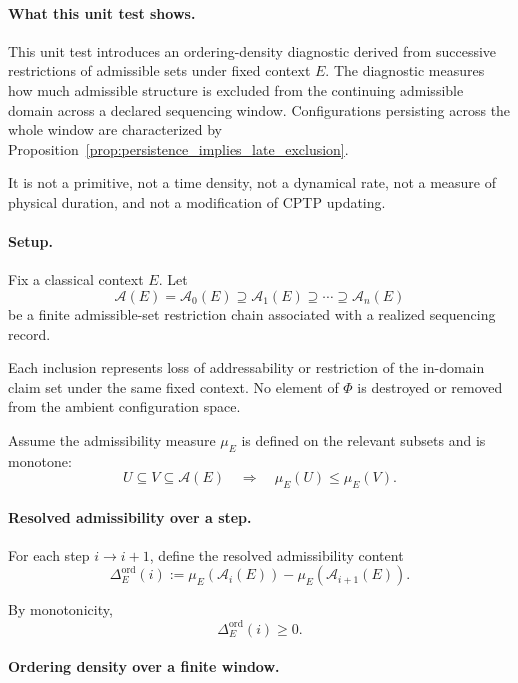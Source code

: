 \documentclass[aps,prx,onecolumn,11pt]{revtex4-2}
\theoremstyle{plain}
\theoremstyle{definition}
\theoremstyle{remark}
\begin{document}
\paragraph{What this unit test shows.}

This unit test introduces an ordering-density diagnostic derived from
successive restrictions of admissible sets under fixed context \(E\).
The diagnostic measures how much admissible structure is excluded from
the continuing admissible domain across a declared sequencing window.
Configurations persisting across the whole window are characterized by
Proposition~\ref{prop:persistence_implies_late_exclusion}.

It is not a primitive, not a time density, not a dynamical rate, not a
measure of physical duration, and not a modification of CPTP updating.

\paragraph{Setup.}

Fix a classical context \(E\). Let
\[
\mathcal A(E)
=
\mathcal A_0(E)
\supseteq
\mathcal A_1(E)
\supseteq
\cdots
\supseteq
\mathcal A_n(E)
\]
be a finite admissible-set restriction chain associated with a realized
sequencing record.

Each inclusion represents loss of addressability or restriction of the
in-domain claim set under the same fixed context. No element of \(\Phi\)
is destroyed or removed from the ambient configuration space.

Assume the admissibility measure \(\mu_E\) is defined on the relevant
subsets and is monotone:
\[
U\subseteq V\subseteq \mathcal A(E)
\quad\Longrightarrow\quad
\mu_E(U)\leq \mu_E(V).
\]

\paragraph{Resolved admissibility over a step.}

For each step \(i\to i+1\), define the resolved admissibility content
\[
\Delta_E^{\mathrm{ord}}(i)
:=
\mu_E\!\left(\mathcal A_i(E)\right)
-
\mu_E\!\left(\mathcal A_{i+1}(E)\right).
\]

By monotonicity,
\[
\Delta_E^{\mathrm{ord}}(i)\geq 0.
\]

\paragraph{Ordering density over a finite window.}
\end{document}
